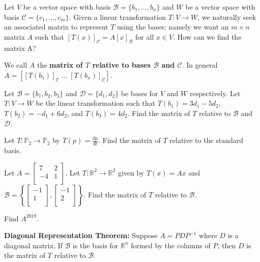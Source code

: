 \documentclass[12pt,letterpaper]{article}
\begin{document}
\begin{enumerate}



\Problem Let $V$ be a vector space with basis $\mathcal{B}=\{b_1, \dots, b_n\}$ and $W$ be a vector space with basis $\mathcal{C}=\{c_1, \dots, c_m\}$. Given a linear transformation $T: V\to W$, we naturally seek an associated matrix to represent $T$ using the bases; namely we want an $m\times n$ matrix $A$ such that $[T(x)]_\mathcal{C}=A [x]_\mathcal{B}$ for all $x \in V$. How can we find the matrix A?

\newpage

We call $A$ the {\bf matrix of $T$ relative to bases $\mathcal{B}$ and $\mathcal{C}$}. In general $A= [[T(b_1)]_\mathcal{C} \; \dots \; [T(b_n)]_\mathcal{C}]$.

\Problem Let $\mathcal{B}=\{b_1, b_2, b_3\}$ and $\mathcal{D}=\{d_1, d_2\}$ be bases for $V$ and $W$ respectively. Let $T: V \to W$ be the linear transformation such that $T(b_1)=3d_1-5d_2$, $T(b_2)=-d_1+6d_2$, and $T(b_3)=4d_2$. Find the matrix of $T$ relative to $\mathcal{B}$ and $\mathcal{D}$.

\vfill

\Problem Let $T: \mathbb{P}_2 \to \mathbb{P}_2$ by $T(p)=\frac{dp}{dt}$. Find the matrix of $T$ relative to the standard basis.

\vfill

\newpage


\Problem Let $A=\begin{bmatrix} 7 & 2\\ -4 & 1\\ \end{bmatrix}$. Let $T: \mathbb{R}^2 \to \mathbb{R}^2$ given by $T(x)=Ax$ and $\mathcal{B}=\left \{\begin{bmatrix} -1\\ 1\\ \end{bmatrix}, \begin{bmatrix} -1\\ 2\\ \end{bmatrix} \right\}.$
\Part Find the matrix of $T$ relative to $\mathcal{B}$.

\vfill

\Part Find $A^{2019}$.

\vfill 

{\bf Diagonal Representation Theorem:} Suppose $A= P D P^{-1}$ where $D$ is a diagonal matrix. If $\mathcal{B}$ is the basis for $\mathbb{R}^n$ formed by the columns of $P$, then $D$ is the matrix of $T$ relative to $\mathcal{B}$. 


\end{enumerate}
\end{document}

